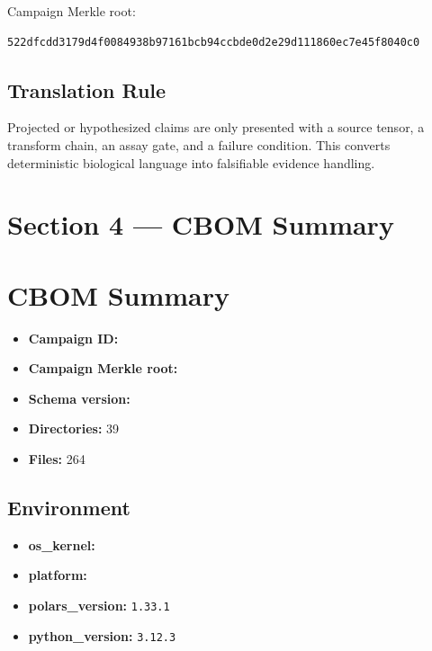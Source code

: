 \documentclass[11pt,a4paper]{article}
\providecommand{\tightlist}{\setlength{\itemsep}{0pt}\setlength{\parskip}{0pt}}
\begin{document}
Campaign Merkle root:

\begin{lstlisting}
522dfcdd3179d4f0084938b97161bcb94ccbde0d2e29d111860ec7e45f8040c0
\end{lstlisting}

\hypertarget{translation-rule}{%
\subsection{Translation Rule}\label{translation-rule}}

Projected or hypothesized claims are only presented with a source tensor, a transform chain, an
assay gate, and a failure condition. This converts deterministic biological language into
falsifiable evidence handling.

\hypertarget{section-4--cbom-summary}{%
\section{Section 4 --- CBOM Summary}\label{section-4--cbom-summary}}

\hypertarget{cbom-summary}{%
\section{CBOM Summary}\label{cbom-summary}}

\begin{itemize}
\tightlist
\item
  \textbf{Campaign ID:} \texttt{}
\item
  \textbf{Campaign Merkle root:}
  \texttt{}
\item
  \textbf{Schema version:} \texttt{}
\item
  \textbf{Directories:} 39
\item
  \textbf{Files:} 264
\end{itemize}

\hypertarget{environment}{%
\subsection{Environment}\label{environment}}

\begin{itemize}
\tightlist
\item
  \textbf{os\_kernel:} \texttt{}
\item
  \textbf{platform:} \texttt{}
\item
  \textbf{polars\_version:} \texttt{1.33.1}
\item
  \textbf{python\_version:} \texttt{3.12.3}
\end{itemize}
\end{document}
